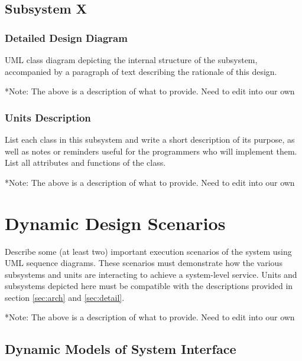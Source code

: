 \documentclass[12pt]{article}
\begin{document}
\begin{table}[H]
\begin{center}
{\begin{tabular}{|l|p{0.8\linewidth}|}
\end{tabular}}
\end{center}
\end{table}

\clearpage

\subsection{Subsystem X}

\subsubsection{Detailed Design Diagram}

UML class diagram depicting the internal structure of the subsystem,
accompanied by a paragraph of text describing the rationale of this design.

*Note: The above is a description of what to provide. Need to edit into our own




\subsubsection{Units Description}

List each class in this subsystem and write a short description of its purpose,
as well as notes or reminders useful for the programmers who will implement them.
List all attributes and functions of the class.

*Note: The above is a description of what to provide. Need to edit into our own

\section{Dynamic Design Scenarios}

Describe some (at least two) important execution scenarios of the system using UML sequence diagrams.
These scenarios must demonstrate how the various subsystems and units are interacting to achieve a system-level service.
Units and subsystems depicted here must be compatible with the descriptions provided in
section \ref{sec:arch} and \ref{sec:detail}.

*Note: The above is a description of what to provide. Need to edit into our own


\subsection{Dynamic Models of System Interface}
\end{document}
